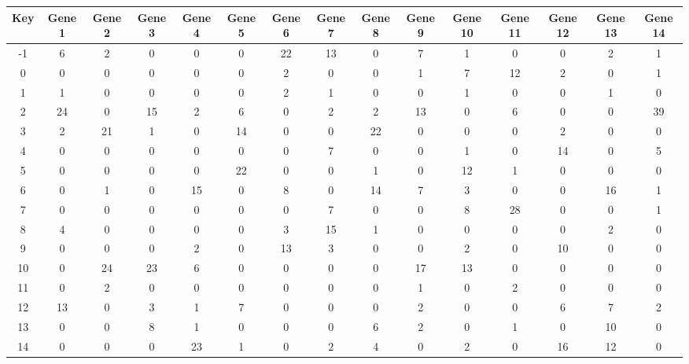 \begin{tabular}{|c|c|c|c|c|c|c|c|c|c|c|c|c|c|c|}
\hline
Key & Gene 1 & Gene 2 & Gene 3 & Gene 4 & Gene 5 & Gene 6 & Gene 7 & Gene 8 & Gene 9 & Gene 10 & Gene 11 & Gene 12 & Gene 13 & Gene 14 \\
\hline
-1 & 6 & 2 & 0 & 0 & 0 & 22 & 13 & 0 & 7 & 1 & 0 & 0 & 2 & 1 \\
0 & 0 & 0 & 0 & 0 & 0 & 2 & 0 & 0 & 1 & 7 & 12 & 2 & 0 & 1 \\
1 & 1 & 0 & 0 & 0 & 0 & 2 & 1 & 0 & 0 & 1 & 0 & 0 & 1 & 0 \\
2 & 24 & 0 & 15 & 2 & 6 & 0 & 2 & 2 & 13 & 0 & 6 & 0 & 0 & 39 \\
3 & 2 & 21 & 1 & 0 & 14 & 0 & 0 & 22 & 0 & 0 & 0 & 2 & 0 & 0 \\
4 & 0 & 0 & 0 & 0 & 0 & 0 & 7 & 0 & 0 & 1 & 0 & 14 & 0 & 5 \\
5 & 0 & 0 & 0 & 0 & 22 & 0 & 0 & 1 & 0 & 12 & 1 & 0 & 0 & 0 \\
6 & 0 & 1 & 0 & 15 & 0 & 8 & 0 & 14 & 7 & 3 & 0 & 0 & 16 & 1 \\
7 & 0 & 0 & 0 & 0 & 0 & 0 & 7 & 0 & 0 & 8 & 28 & 0 & 0 & 1 \\
8 & 4 & 0 & 0 & 0 & 0 & 3 & 15 & 1 & 0 & 0 & 0 & 0 & 2 & 0 \\
9 & 0 & 0 & 0 & 2 & 0 & 13 & 3 & 0 & 0 & 2 & 0 & 10 & 0 & 0 \\
10 & 0 & 24 & 23 & 6 & 0 & 0 & 0 & 0 & 17 & 13 & 0 & 0 & 0 & 0 \\
11 & 0 & 2 & 0 & 0 & 0 & 0 & 0 & 0 & 1 & 0 & 2 & 0 & 0 & 0 \\
12 & 13 & 0 & 3 & 1 & 7 & 0 & 0 & 0 & 2 & 0 & 0 & 6 & 7 & 2 \\
13 & 0 & 0 & 8 & 1 & 0 & 0 & 0 & 6 & 2 & 0 & 1 & 0 & 10 & 0 \\
14 & 0 & 0 & 0 & 23 & 1 & 0 & 2 & 4 & 0 & 2 & 0 & 16 & 12 & 0 \\
\hline
\end{tabular}